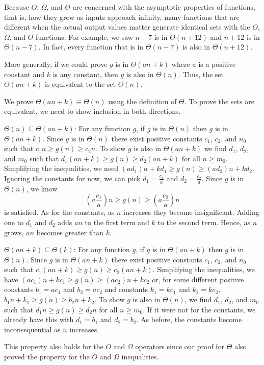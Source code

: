 \begin{schemeregion}
 Because $O$, $\Omega$, and $\Theta$ are concerned with the asymptotic properties of functions, that is, how they grow as inputs approach infinity, many functions that are different when the actual output values matter generate identical sets with the $O$, $\Omega$, and $\Theta$ functions.  For example, we saw $n-7$ is in $\Theta(n+12)$ and $n+12$ is in $\Theta(n-7)$.  In fact, every function that is in $\Theta(n-7)$ is also in $\Theta(n+12)$.  

More generally, if we could prove $g$ is in $\Theta(an+k)$ where $a$ is a positive constant and $k$ is any constant, then $g$ is also in $\Theta(n)$.  Thus, the set $\Theta(an+k)$ is equivalent to the set $\Theta(n)$.  

We prove $\Theta(an+k) \equiv \Theta(n)$ using the definition of $\Theta$.  To prove the sets are equivalent, we need to show inclusion in both directions.
\begin{descriptionlist}
\item[$\Theta(n) \subseteq \Theta(an+k)$:] For any function $g$, if $g$ is in $\Theta(n)$ then $g$ is in $\Theta(an+k)$. Since $g$ is in $\Theta(n)$ there exist positive constants $c_1$, $c_2$, and $n_0$ such that $c_1 n \ge g(n) \ge c_2 n$.  To show $g$ is also in $\Theta(an+k)$ we find $d_1$, $d_2$, and $m_0$ such that $d_1 (an + k) \ge g(n) \ge d_2 (an+k)$ for all $n \ge m_0$.  Simplifying the inequalities, we need $(ad_1)n + kd_1 \ge g(n) \ge (ad_2)n + kd_2$.  Ignoring the constants for now, we can pick $d_1 = \frac{c_1}{a}$ and $d_2 = \frac{c_2}{a}$.  Since $g$ is in $\Theta(n)$, we know 
\begin{displaymath}
(a\frac{c_1}{a})n \ge g(n) \ge (a\frac{c_2}{a})n
\end{displaymath}
is satisfied.  As for the constants, as $n$ increases they become insignificant.  Adding one to $d_1$ and $d_2$ adds $an$ to the first term and $k$ to the second term. Hence, as $n$ grows, $an$ becomes greater than $k$.  
\item[$\Theta(an + k) \subseteq \Theta(k)$:] For any function $g$, if $g$ is in $\Theta(an+k)$ then $g$ is in $\Theta(n)$. Since $g$ is in $\Theta(an+k)$ there exist positive constants $c_1$, $c_2$, and $n_0$ such that $c_1 (an+k) \ge g(n) \ge c_2 (an+k)$.  Simplifying the inequalities, we have $(ac_1)n + kc_1 \ge g(n) \ge (ac_2)n + kc_2$ or, for some different positive constants $b_1 = ac_1$ and $b_2 = ac_2$ and constants $k_1 = kc_1$ and $k_2=kc_2$, $b_1n + k_1 \ge g(n) \ge b_2 n + k_2$.  To show $g$ is also in $\Theta(n)$, we find $d_1$, $d_2$, and $m_0$ such that $d_1 n \ge g(n) \ge d_2 n$ for all $n \ge m_0$.  If it were not for the constants, we already have this with $d_1 = b_1$ and $d_2 = b_2$.  As before, the constants become inconsequential as $n$ increases.
\end{descriptionlist}
This property also holds for the $O$ and $\Omega$ operators since our proof for $\Theta$ also proved the property for the $O$ and $\Omega$ inequalities.


\end{schemeregion}

